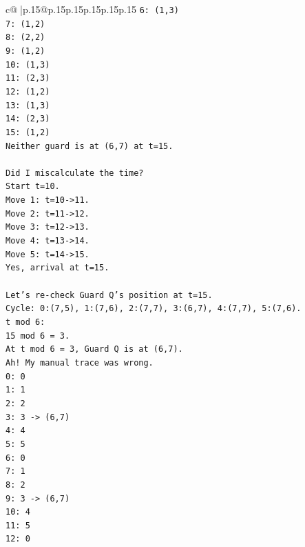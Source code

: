 \documentclass{article}
\begin{document}
{\begin{supertabular}{c@{$\;$}|p{.15\linewidth}@{}p{.15\linewidth}p{.15\linewidth}p{.15\linewidth}p{.15\linewidth}p{.15\linewidth}}
{{{\texttt{6: (1,3)} \\
\texttt{7: (1,2)} \\
\texttt{8: (2,2)} \\
\texttt{9: (1,2)} \\
\texttt{10: (1,3)} \\
\texttt{11: (2,3)} \\
\texttt{12: (1,2)} \\
\texttt{13: (1,3)} \\
\texttt{14: (2,3)} \\
\texttt{15: (1,2)} \\
\texttt{Neither guard is at (6,7) at t=15.} \\
\\ 
\texttt{Did I miscalculate the time?} \\
\texttt{Start t=10.} \\
\texttt{Move 1: t=10{-}>11.} \\
\texttt{Move 2: t=11{-}>12.} \\
\texttt{Move 3: t=12{-}>13.} \\
\texttt{Move 4: t=13{-}>14.} \\
\texttt{Move 5: t=14{-}>15.} \\
\texttt{Yes, arrival at t=15.} \\
\\ 
\texttt{Let's re{-}check Guard Q's position at t=15.} \\
\texttt{Cycle: 0:(7,5), 1:(7,6), 2:(7,7), 3:(6,7), 4:(7,7), 5:(7,6).} \\
\texttt{t mod 6:} \\
\texttt{15 mod 6 = 3.} \\
\texttt{At t mod 6 = 3, Guard Q is at (6,7).} \\
\texttt{Ah! My manual trace was wrong.} \\
\texttt{0: 0} \\
\texttt{1: 1} \\
\texttt{2: 2} \\
\texttt{3: 3 {-}> (6,7)} \\
\texttt{4: 4} \\
\texttt{5: 5} \\
\texttt{6: 0} \\
\texttt{7: 1} \\
\texttt{8: 2} \\
\texttt{9: 3 {-}> (6,7)} \\
\texttt{10: 4} \\
\texttt{11: 5} \\
\texttt{12: 0} \\
}}}
\end{supertabular}}
\end{document}

